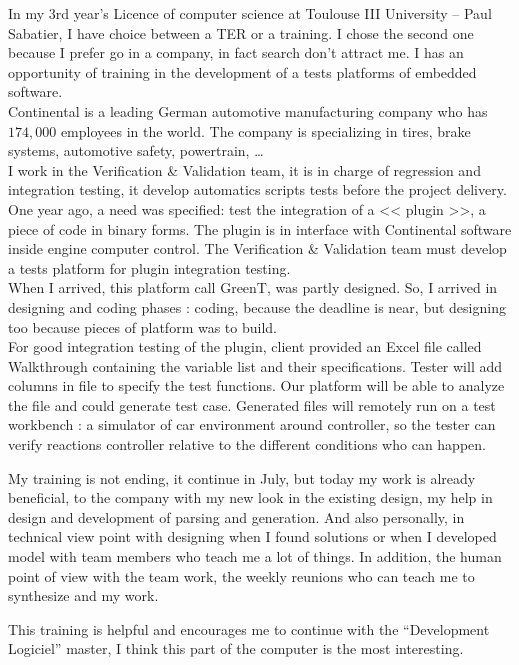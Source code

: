 \documentclass[a4paper, 12pt]{article}
\begin{document}
	\maketitle
	In my 3rd year's Licence of computer science at Toulouse III University – Paul Sabatier, I have choice between a TER or a training. I chose the second one because I prefer go in a company, in fact search don't attract me. I has an opportunity of training in the development of a tests platforms of embedded software.\\ 
	
Continental is a leading German automotive manufacturing company who has $174,000$ employees in the world. The company is specializing in tires, brake systems, automotive safety, powertrain, \ldots\\
I work in the Verification \& Validation team, it is in charge of regression and integration testing, it develop automatics scripts tests before the project delivery. \\

One year ago, a need was specified: test the integration of a << plugin >>, a piece of code in binary forms. The plugin is in interface with Continental software
inside engine computer control. The Verification \& Validation team must develop a tests platform for plugin integration testing.\\

When I arrived, this platform call GreenT, was partly designed. So, I arrived in designing and coding phases : coding, because the deadline is 	near, but
designing too because pieces of platform was to build.\\

For good integration testing of the plugin, client provided an Excel file called Walkthrough containing the variable list and their specifications. Tester will add columns in file to specify the test functions. Our platform will be able to analyze the file and could generate test case. Generated files will remotely run on a test workbench : a simulator of car environment around controller, so the tester can verify reactions controller relative to the different conditions who can happen.

My training is not ending, it continue in July, but today my work is already beneficial, to the company with my new look in the existing design, my help in design and development of parsing and generation. And also personally, in technical view point with designing when I found solutions or when I developed model with team members who teach me a lot of things. In addition, the human point of view with the team work, the weekly reunions who can teach me to synthesize and my work.

This training is helpful and encourages me to continue with the “Development Logiciel” master, I think this part of the computer is the most interesting.
\end{document}
